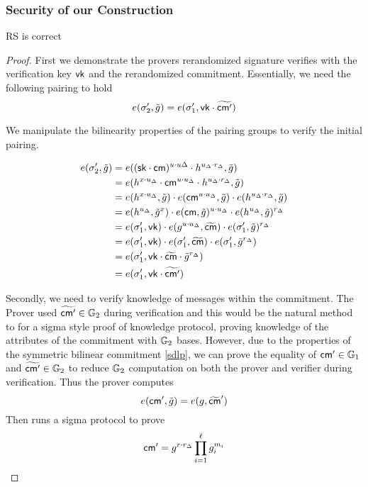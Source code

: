 \subsubsection{Security of our Construction}
\begin{theorem}
    RS is correct
\end{theorem}
\begin{proof}
    First we demonstrate the provers rerandomized signature verifies with the verification key $\mathsf{vk}$ and the rerandomized commitment. Essentially, we need the following pairing to hold
    \[
          e(\sigma_2', \tilde{g}) = e(\sigma_1', \mathsf{vk} \cdot \widetilde{\mathsf{cm}'})
    \]

    We manipulate the bilinearity properties of the pairing groups to verify the initial pairing.
    
    \begin{align*}
        e(\sigma_2', \tilde{g}) &= e((\mathsf{sk} \cdot \mathsf{cm})^{u \cdot u\Delta}\cdot h^{u_\Delta \cdot r_\Delta}, \tilde{g}) \\
        &= e(h^{x \cdot u_\Delta}\cdot \mathsf{cm}^{u \cdot u_\Delta} \cdot h^{u_\Delta \cdot r_\Delta}, \tilde{g}) \\
        &= e(h^{x \cdot u_\Delta}, \tilde{g}) \cdot e(\mathsf{cm}^{u \cdot u_\Delta}, \tilde{g}) \cdot e(h^{ u_\Delta \cdot r_\Delta}, \tilde{g}) \\
        &= e(h^{u_\Delta}, \tilde{g}^x) \cdot e(\mathsf{cm}, \tilde{g})^{u \cdot u_\Delta} \cdot e(h^{ u_\Delta}, \tilde{g})^{r_\Delta} \\
        &= e(\sigma_1', \mathsf{vk}) \cdot e(g^{u \cdot u_\Delta}, \widetilde{\mathsf{cm}}) \cdot e(\sigma_1', \tilde{g})^{r_\Delta} \\
        &= e(\sigma_1', \mathsf{vk}) \cdot e(\sigma_1', \widetilde{\mathsf{cm}}) \cdot e(\sigma_1', \tilde{g}^{r_\Delta}) \\
        &= e(\sigma_1', \mathsf{vk} \cdot \widetilde{\mathsf{cm}} \cdot \tilde{g}^{r_\Delta}) \\
        &= e(\sigma_1', \mathsf{vk} \cdot \widetilde{\mathsf{cm}'}) \\
    \end{align*}

    Secondly, we need to verify knowledge of messages within the commitment. The Prover used $\widetilde{\mathsf{cm}'} \in \mathbb{G}_2$ during verification and this would be the natural method to for a sigma style proof of knowledge protocol, proving knowledge of the attributes of the commitment with $\mathbb{G}_2$ bases. However, due to the properties of the symmetric bilinear commitment \ref{sdlp}, we can prove the equality of $\mathsf{cm}' \in \mathbb{G}_1$ and $\widetilde{\mathsf{cm}'} \in \mathbb{G}_2$ to reduce $\mathbb{G}_2$ computation on both the prover and verifier during verification. 
    Thus the prover computes 
    \[
        e(\mathsf{cm}', \tilde{g}) = e(g, \widetilde{\mathsf{cm}}')
    \]
    Then runs a sigma protocol to prove
    \[
    \mathsf{cm}' = g^{r \cdot r_\Delta} \prod_{i=1}^\ell g_i^{m_i}
    \]

\end{proof}







